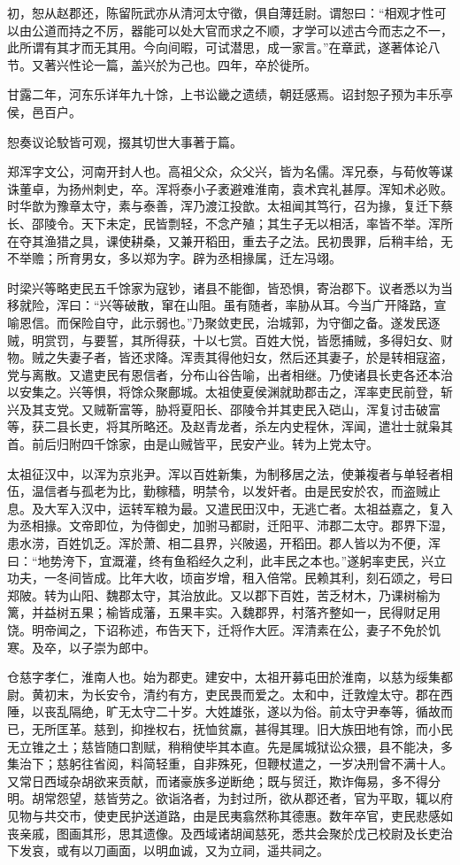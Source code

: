 \documentclass[12pt,UTF8]{ctexbook}
\begin{document}
初，恕从赵郡还，陈留阮武亦从清河太守徵，俱自薄廷尉。谓恕曰：“相观才性可以由公道而持之不厉，器能可以处大官而求之不顺，才学可以述古今而志之不一，此所谓有其才而无其用。今向间暇，可试潜思，成一家言。”在章武，遂著体论八节。又著兴性论一篇，盖兴於为己也。四年，卒於徙所。

甘露二年，河东乐详年九十馀，上书讼畿之遗绩，朝廷感焉。诏封恕子预为丰乐亭侯，邑百户。

恕奏议论駮皆可观，掇其切世大事著于篇。

郑浑字文公，河南开封人也。高祖父众，众父兴，皆为名儒。浑兄泰，与荀攸等谋诛董卓，为扬州刺史，卒。浑将泰小子袤避难淮南，袁术宾礼甚厚。浑知术必败。时华歆为豫章太守，素与泰善，浑乃渡江投歆。太祖闻其笃行，召为掾，复迁下蔡长、邵陵令。天下未定，民皆剽轻，不念产殖；其生子无以相活，率皆不举。浑所在夺其渔猎之具，课使耕桑，又兼开稻田，重去子之法。民初畏罪，后稍丰给，无不举赡；所育男女，多以郑为字。辟为丞相掾属，迁左冯翊。

时梁兴等略吏民五千馀家为寇钞，诸县不能御，皆恐惧，寄治郡下。议者悉以为当移就险，浑曰：“兴等破散，窜在山阻。虽有随者，率胁从耳。今当广开降路，宣喻恩信。而保险自守，此示弱也。”乃聚敛吏民，治城郭，为守御之备。遂发民逐贼，明赏罚，与要誓，其所得获，十以七赏。百姓大悦，皆愿捕贼，多得妇女、财物。贼之失妻子者，皆还求降。浑责其得他妇女，然后还其妻子，於是转相寇盗，党与离散。又遣吏民有恩信者，分布山谷告喻，出者相继。乃使诸县长吏各还本治以安集之。兴等惧，将馀众聚鄜城。太祖使夏侯渊就助郡击之，浑率吏民前登，斩兴及其支党。又贼靳富等，胁将夏阳长、邵陵令并其吏民入硙山，浑复讨击破富等，获二县长吏，将其所略还。及赵青龙者，杀左内史程休，浑闻，遣壮士就枭其首。前后归附四千馀家，由是山贼皆平，民安产业。转为上党太守。

太祖征汉中，以浑为京兆尹。浑以百姓新集，为制移居之法，使兼複者与单轻者相伍，温信者与孤老为比，勤稼穑，明禁令，以发奸者。由是民安於农，而盗贼止息。及大军入汉中，运转军粮为最。又遣民田汉中，无逃亡者。太祖益嘉之，复入为丞相掾。文帝即位，为侍御史，加驸马都尉，迁阳平、沛郡二太守。郡界下湿，患水涝，百姓饥乏。浑於萧、相二县界，兴陂遏，开稻田。郡人皆以为不便，浑曰：“地势洿下，宜溉灌，终有鱼稻经久之利，此丰民之本也。”遂躬率吏民，兴立功夫，一冬间皆成。比年大收，顷亩岁增，租入倍常。民赖其利，刻石颂之，号曰郑陂。转为山阳、魏郡太守，其治放此。又以郡下百姓，苦乏材木，乃课树榆为篱，并益树五果；榆皆成藩，五果丰实。入魏郡界，村落齐整如一，民得财足用饶。明帝闻之，下诏称述，布告天下，迁将作大匠。浑清素在公，妻子不免於饥寒。及卒，以子崇为郎中。

仓慈字孝仁，淮南人也。始为郡吏。建安中，太祖开募屯田於淮南，以慈为绥集都尉。黄初末，为长安令，清约有方，吏民畏而爱之。太和中，迁敦煌太守。郡在西陲，以丧乱隔绝，旷无太守二十岁。大姓雄张，遂以为俗。前太守尹奉等，循故而已，无所匡革。慈到，抑挫权右，抚恤贫羸，甚得其理。旧大族田地有馀，而小民无立锥之土；慈皆随口割赋，稍稍使毕其本直。先是属城狱讼众猥，县不能决，多集治下；慈躬往省阅，料简轻重，自非殊死，但鞭杖遣之，一岁决刑曾不满十人。又常日西域杂胡欲来贡献，而诸豪族多逆断绝；既与贸迁，欺诈侮易，多不得分明。胡常怨望，慈皆劳之。欲诣洛者，为封过所，欲从郡还者，官为平取，辄以府见物与共交市，使吏民护送道路，由是民夷翕然称其德惠。数年卒官，吏民悲感如丧亲戚，图画其形，思其遗像。及西域诸胡闻慈死，悉共会聚於戊己校尉及长吏治下发哀，或有以刀画面，以明血诚，又为立祠，遥共祠之。
\end{document}
